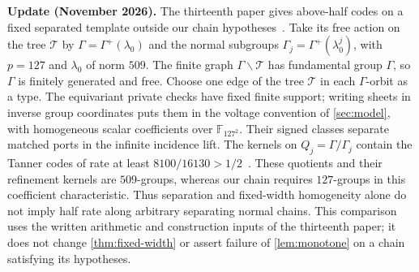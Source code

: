 \textbf{Update (November 2026).} The thirteenth paper gives above-half
codes on a fixed separated template outside our chain hypotheses~\cite{StorageCodes2026}.
Take its free action on the tree $\mathcal T$ by $\Gamma=\Gamma^+(\lambda_0)$ and the normal
subgroups $\Gamma_j=\Gamma^+(\lambda_0^j)$, with $p=127$ and
$\lambda_0$ of norm $509$. The finite graph $\Gamma\backslash\mathcal T$
has fundamental group $\Gamma$, so $\Gamma$ is finitely generated and free.
Choose one edge of the tree $\mathcal T$ in each $\Gamma$-orbit as a type.
The equivariant private checks have fixed finite support; writing sheets
in inverse group coordinates puts them in the voltage convention of
\cref{sec:model}, with homogeneous scalar coefficients over $\mathbb F_{127^2}$.
Their signed classes separate matched ports in the infinite incidence
lift. The kernels on $Q_j=\Gamma/\Gamma_j$ contain the Tanner codes of
rate at least $8100/16130>1/2$~\cite[Sections~4--5 and Theorem~A]{StorageCodes2026}.
These quotients and their refinement kernels are $509$-groups, whereas
our chain requires $127$-groups in this coefficient characteristic.
Thus separation and fixed-width homogeneity alone do not imply half
rate along arbitrary separating normal chains. This comparison uses
the written arithmetic and construction inputs of the thirteenth paper;
it does not change \cref{thm:fixed-width} or assert failure of
\cref{lem:monotone} on a chain satisfying its hypotheses.
